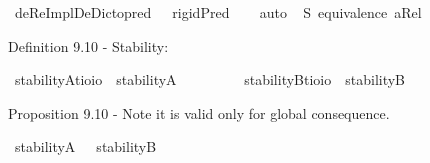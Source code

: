 \begin{isabellebody}
\ {\isachardoublequoteopen}{\isasymlfloor}deReImplDeDicto{\isacharunderscore}pred\ {\isacharparenleft}{\isasymtau}{\isacharcolon}{\isacharcolon}{\isasymup}{\isasymlangle}{\isasymzero}{\isasymrangle}{\isacharparenright}\ \isactrlbold {\isasymrightarrow}\ rigidPred\ {\isasymtau}{\isasymrfloor}{\isachardoublequoteclose}%
\isadelimproof
\ %
\endisadelimproof
%
\isatagproof
{}\isamarkupfalse%
\ auto%
\endisatagproof
{\isafoldproof}%
%
\isadelimproof
%
\endisadelimproof
%
\isamarkuptrue%
\isamarkupfalse%
\ \isanewline
S{}{\isacharcolon}\ {\isachardoublequoteopen}equivalence\ aRel{\isachardoublequoteclose}\ \ %
%
\begin{isamarkuptext}%
Definition 9.10 - Stability:%
\end{isamarkuptext}\isamarkuptrue%
\isamarkupfalse%
\ stabilityA{\isacharcolon}{\isacharcolon}{\isachardoublequoteopen}{\isacharparenleft}{\isacharprime}t{\isasymRightarrow}io{\isacharparenright}{\isasymRightarrow}io{\isachardoublequoteclose}\ \ {\isachardoublequoteopen}stabilityA\ {\isasymtau}\ {\isasymequiv}\ \isactrlbold {\isasymforall}{\isasymalpha}{\isachardot}\ {\isacharparenleft}{\isasymtau}\ {\isasymalpha}{\isacharparenright}\ \isactrlbold {\isasymrightarrow}\ \isactrlbold {\isasymbox}{\isacharparenleft}{\isasymtau}\ {\isasymalpha}{\isacharparenright}{\isachardoublequoteclose}\isanewline
{}\isamarkupfalse%
\ stabilityB{\isacharcolon}{\isacharcolon}{\isachardoublequoteopen}{\isacharparenleft}{\isacharprime}t{\isasymRightarrow}io{\isacharparenright}{\isasymRightarrow}io{\isachardoublequoteclose}\ \ {\isachardoublequoteopen}stabilityB\ {\isasymtau}\ {\isasymequiv}\ \isactrlbold {\isasymforall}{\isasymalpha}{\isachardot}\ \isactrlbold {\isasymdiamond}{\isacharparenleft}{\isasymtau}\ {\isasymalpha}{\isacharparenright}\ \isactrlbold {\isasymrightarrow}\ {\isacharparenleft}{\isasymtau}\ {\isasymalpha}{\isacharparenright}{\isachardoublequoteclose}%
\begin{isamarkuptext}%
Proposition 9.10 - Note it is valid only for global consequence.%
\end{isamarkuptext}\isamarkuptrue%
\isamarkupfalse%
\ {\isachardoublequoteopen}{\isasymlfloor}stabilityA\ {\isacharparenleft}{\isasymtau}{\isacharcolon}{\isacharcolon}{\isasymup}{\isasymlangle}{\isasymzero}{\isasymrangle}{\isacharparenright}{\isasymrfloor}\ {\isasymlongrightarrow}\ {\isasymlfloor}stabilityB\ {\isasymtau}{\isasymrfloor}{\isachardoublequoteclose}%

\end{isabellebody}
